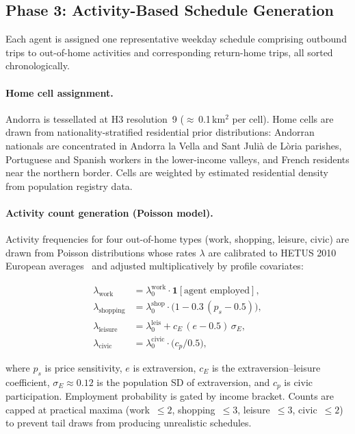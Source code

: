 \documentclass[sustainability,article,submit,pdftex,moreauthors]{Definitions/mdpi}
\begin{document}
\subsection{Phase 3: Activity-Based Schedule Generation}
\label{subsec:schedule_generation}

Each agent is assigned one representative weekday schedule comprising
outbound trips to out-of-home activities and corresponding return-home trips,
all sorted chronologically.

\paragraph{Home cell assignment.}
Andorra is tessellated at H3 resolution~9 ($\approx$\,0.1\,km$^2$ per cell).
Home cells are drawn from nationality-stratified residential prior distributions:
Andorran nationals are concentrated in Andorra la Vella and Sant Juli\`a de
L\`oria parishes, Portuguese and Spanish workers in the lower-income valleys,
and French residents near the northern border. Cells are weighted by estimated
residential density from population registry data.

\paragraph{Activity count generation (Poisson model).}
Activity frequencies for four out-of-home types (work, shopping, leisure,
civic) are drawn from Poisson distributions whose rates $\lambda$ are
calibrated to HETUS 2010 European averages~\cite{hetus2010} and adjusted
multiplicatively by profile covariates:

\begin{linenomath}
\begin{align}
\lambda_\text{work}     &= \lambda_0^\text{work}
                           \cdot \mathbf{1}[\text{agent employed}], \\
\lambda_\text{shopping} &= \lambda_0^\text{shop}
                           \cdot \bigl(1 - 0.3\,(p_s - 0.5)\bigr), \\
\lambda_\text{leisure}  &= \lambda_0^\text{leis}
                           + c_E\,(e - 0.5)\,\sigma_E, \\
\lambda_\text{civic}    &= \lambda_0^\text{civic}
                           \cdot \bigl(c_p / 0.5\bigr),
\end{align}
\end{linenomath}

where $p_s$ is price sensitivity, $e$ is extraversion, $c_E$ is the
extraversion--leisure coefficient, $\sigma_E \approx 0.12$ is the
population SD of extraversion, and $c_p$ is civic participation.
Employment probability is gated by income bracket. Counts are capped
at practical maxima (work~$\leq 2$, shopping~$\leq 3$, leisure~$\leq 3$,
civic~$\leq 2$) to prevent tail draws from producing unrealistic schedules.
\end{document}
